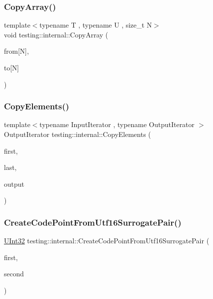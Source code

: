 \subsubsection{\texorpdfstring{CopyArray()}{CopyArray()}\hspace{0.1cm}{\footnotesize\ttfamily [3/3]}}
{\footnotesize\ttfamily template$<$typename T , typename U , size\+\_\+t N$>$ \\
void testing\+::internal\+::\+Copy\+Array (\begin{DoxyParamCaption}\item[{const T(\&)}]{from\mbox{[}\+N\mbox{]},  }\item[{U($\ast$)}]{to\mbox{[}\+N\mbox{]} }\end{DoxyParamCaption})\hspace{0.3cm}{\ttfamily [inline]}}

\mbox{\label{namespacetesting_1_1internal_a9372c12747bcf964aacb1284f8048cae}} 
\subsubsection{\texorpdfstring{CopyElements()}{CopyElements()}}
{\footnotesize\ttfamily template$<$typename Input\+Iterator , typename Output\+Iterator $>$ \\
Output\+Iterator testing\+::internal\+::\+Copy\+Elements (\begin{DoxyParamCaption}\item[{Input\+Iterator}]{first,  }\item[{Input\+Iterator}]{last,  }\item[{Output\+Iterator}]{output }\end{DoxyParamCaption})\hspace{0.3cm}{\ttfamily [inline]}}

\mbox{\label{namespacetesting_1_1internal_ac8ef1bb10cd9e69de939789b759e6bc9}} 
\subsubsection{\texorpdfstring{CreateCodePointFromUtf16SurrogatePair()}{CreateCodePointFromUtf16SurrogatePair()}}
{\footnotesize\ttfamily \mbox{\hyperlink{namespacetesting_1_1internal_a40d4fffcd2bf56f18b1c380615aa85e3}{U\+Int32}} testing\+::internal\+::\+Create\+Code\+Point\+From\+Utf16\+Surrogate\+Pair (\begin{DoxyParamCaption}\item[{wchar\+\_\+t}]{first,  }\item[{wchar\+\_\+t}]{second }\end{DoxyParamCaption})\hspace{0.3cm}{\ttfamily [inline]}}


